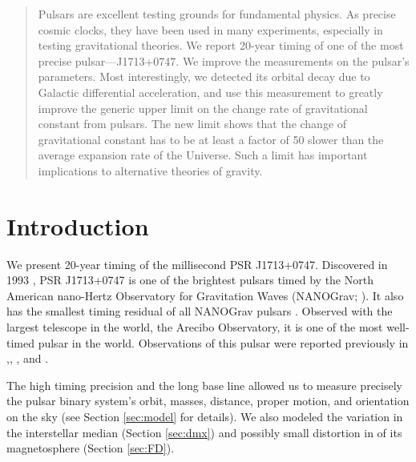 
\begin{abstract}
Pulsars are excellent testing grounds for fundamental physics. As precise
cosmic clocks, they have been used in many experiments, especially in testing
gravitational theories. We report 20-year timing of one of the most precise
pulsar---J1713+0747. We improve the measurements on the pulsar's parameters.
Most interestingly, we detected its orbital decay due to Galactic
differential acceleration, and use this measurement to greatly improve the generic
upper limit on the change rate of gravitational constant from pulsars. The new
limit shows that the change of gravitational constant has to be at least a
factor of 50 slower than the average expansion rate of the Universe. Such a
limit has important implications to alternative theories of gravity.
\end{abstract}


\section{Introduction}
\label{sec:intro}
\linenumbers
We present 20-year timing of the millisecond  PSR J1713+0747. Discovered in
1993 \citep{fwc93}, PSR J1713+0747 is one of the brightest pulsars timed by the
North American nano-Hertz Observatory for Gravitation Waves (NANOGrav;
\citealt{ndf+12, dfg+13}). It also has the smallest timing residual of all NANOGrav pulsars \citep{dfg+13}. Observed with the largest telescope in the world, the Arecibo Observatory, it is one of the most well-timed pulsar in the world.
Observations of this pulsar were reported previously in
\citealt{cfw94},\citealt{ vb03}, \citealt{sns+05}, and \citealt{hbo06}.

The high timing precision and the long base line allowed us to measure 
precisely 
the pulsar binary system's orbit, masses, distance, proper motion, 
and orientation on the sky (see Section \ref{sec:model} for
details). We also modeled the variation in the interstellar median
(Section \ref{sec:dmx}) and possibly small distortion in of its magnetosphere (Section
\ref{sec:FD}). 

